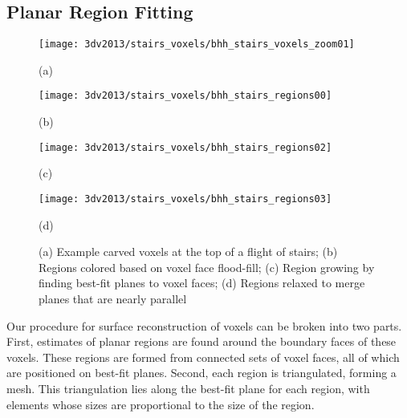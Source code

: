 \documentclass[12pt,onecolumn,oneside]{book}
\begin{document}
\subsection{Planar Region Fitting}
\label{ssec:voxel_region_fitting}

\begin{figure}[t]

	\begin{minipage}[b]{0.45\linewidth}
	\centerline{\texttt{[image: 3dv2013/stairs\_voxels/bhh\_stairs\_voxels\_zoom01]}}
	\centerline{(a)}\medskip
	\end{minipage}
	\hfill
	\begin{minipage}[b]{0.45\linewidth}
	\centerline{\texttt{[image: 3dv2013/stairs\_voxels/bhh\_stairs\_regions00]}}
	\centerline{(b)}\medskip
	\end{minipage}
	\begin{minipage}[b]{0.45\linewidth}
	\centerline{\texttt{[image: 3dv2013/stairs\_voxels/bhh\_stairs\_regions02]}}
	\centerline{(c)}\medskip
	\end{minipage}
	\hfill
	\begin{minipage}[b]{0.45\linewidth}
	\centerline{\texttt{[image: 3dv2013/stairs\_voxels/bhh\_stairs\_regions03]}}
	\centerline{(d)}\medskip
	\end{minipage}

	\caption[Method of region fitting to voxel carving.]{(a) Example carved voxels at the top of a flight of stairs; (b) Regions colored based on voxel face flood-fill; (c) Region growing by finding best-fit planes to voxel faces; (d) Regions relaxed to merge planes that are nearly parallel}
	\label{fig:stairs_voxels}
\end{figure}

Our procedure for surface reconstruction of voxels can be broken into two parts.  First, estimates of planar regions are found around the boundary faces of these voxels.  These regions are formed from connected sets of voxel faces, all of which are positioned on best-fit planes.  Second, each region is triangulated, forming a mesh.  This triangulation lies along the best-fit plane for each region, with elements whose sizes are proportional to the size of the region.

\end{document}
